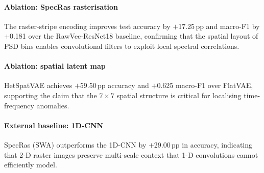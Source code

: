 
\paragraph{Ablation: SpecRas rasterisation}
The raster-stripe encoding improves test accuracy by $+$17.25\,pp and macro-F1 by $+$0.181 over the RawVec-ResNet18 baseline, confirming that the spatial layout of PSD bins enables convolutional filters to exploit local spectral correlations.

\paragraph{Ablation: spatial latent map}
HetSpatVAE achieves $+$59.50\,pp accuracy and $+$0.625 macro-F1 over FlatVAE, supporting the claim that the $7\times7$ spatial structure is critical for localising time-frequency anomalies.

\paragraph{External baseline: 1D-CNN}
SpecRas (SWA) outperforms the 1D-CNN by $+$29.00\,pp in accuracy, indicating that 2-D raster images preserve multi-scale context that 1-D convolutions cannot efficiently model.

